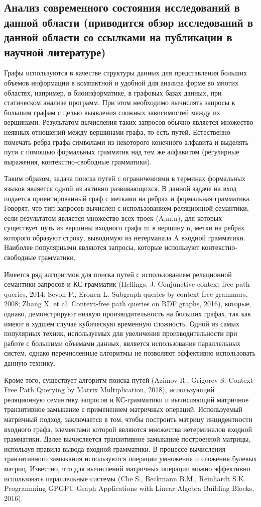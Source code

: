 \documentclass[12pt]{article}  %
\theoremstyle{remark}
\begin{document}
\subsection{Анализ современного состояния исследований в данной области (приводится обзор исследований в данной области со ссылками на публикации в научной литературе)}
Графы используются в качестве структуры данных для представления больших объемов информации в компактной и удобной для анализа форме во многих областях, например, в биоинформатике, в графовых базах данных, при статическом анализе программ. При этом необходимо вычислять запросы к большим графам с целью выявления сложных зависимостей между их вершинами. Результатом вычисления таких запросов обычно является множество неявных отношений между вершинами графа, то есть путей. Естественно помечать ребра графа символами из некоторого конечного алфавита и выделять пути с помощью формальных грамматик над тем же алфавитом (регулярные выражения, контекстно-свободные грамматики).

Таким образом, задача поиска путей с ограничениями в терминах формальных языков является одной из активно развивающихся. В данной задаче на вход подается ориентированный граф с метками на ребрах и формальная грамматика. Говорят, что тип запросов вычислен с использованием реляционной семантики, если результатом является множество всех троек (A,m,n), для которых существует путь из вершины входного графа m в вершину n, метки на ребрах которого образуют строку, выводимую из нетерманала A входной грамматики. Наиболее популярными являются запросы, которые используют контекстно-свободные грамматики.

Имеется ряд алгоритмов для поиска путей с использованием реляционной семантики запросов и КС-грамматик (Hellings. J. Conjunctive context-free path queries, 2014; Sevon P., Eronen L. Subgraph queries by context-free grammars, 2008; Zhang X. et al. Context-free path queries on RDF graphs, 2016), которые, однако, демонстрируют низкую производительность на больших графах, так как имеют в худшем случае кубическую временную сложность. Одной из самых популярных техник, используемых для увеличения производительности при работе с большими объемами данных, является использование параллельных систем, однако перечисленные алгоритмы не позволяют эффективно использовать данную технику.

Кроме того, существует алгоритм поиска путей (Azimov R., Grigorev S. Context-Free Path Querying by Matrix Multiplication, 2018), использующий реляционную семантику запросов и КС-грамматики и вычисляющий матричное транзитивное замыкание с применением матричных операций. Используемый матричный подход, заключается в том, чтобы построить матрицу инцидентности входного графа, элементами которой являются множества нетерминалов входной грамматики. Далее вычисляется транзитивное замыкание построенной матрицы, используя правила вывода входной грамматики. В процессе вычисления транзитивного замыкания используются операции умножения и сложения булевых матриц. Известно, что для вычислений матричных операции можно эффективно использовать параллельные системы (Che S., Beckmann B.M., Reinhardt S.K. Programming GPGPU Graph Applications with Linear Algebra Building Blocks, 2016).
\end{document}
